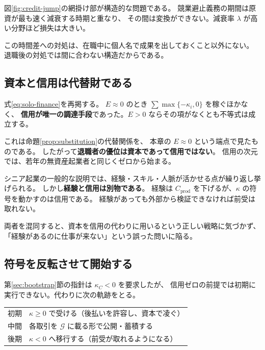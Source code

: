 図\ref{fig:credit-jump}の網掛け部が構造的な問題である。
競業避止義務の期間は原資が最も速く減衰する時期と重なり、
その間は変換ができない。減衰率 $\lambda$ が高い分野ほど損失は大きい。

この時間差への対処は、在職中に個人名で成果を出しておくこと以外にない。
退職後の対処では間に合わない構造だからである。

\subsection{資本と信用は代替財である}

式\eqref{eq:solo-finance}を再掲する。
$E\approx 0$ のとき $\sum\max\{-\kappa_i,0\}$ を稼ぐほかなく、
\textbf{信用が唯一の調達手段}であった。$E>0$ ならその項がなくとも不等式は成立する。

これは命題\ref{prop:substitution}の代替関係を、
本章の $E\approx 0$ という端点で見たものである。
したがって\textbf{退職者の優位は資本であって信用ではない}。
信用の次元では、若年の無資産起業者と同じくゼロから始まる。

\begin{remark}[経験と信用の混同]
シニア起業の一般的な説明では、経験・スキル・人脈が活かせる点が繰り返し挙げられる。
しかし\textbf{経験と信用は別物である}。
経験は $C_{\mathrm{prod}}$ を下げるが、$\kappa$ の符号を動かすのは信用である。
経験があっても外部から検証できなければ前受は取れない。

両者を混同すると、資本を信用の代わりに用いるという正しい戦略に気づかず、
「経験があるのに仕事が来ない」という誤った問いに陥る。
\end{remark}

\subsection{符号を反転させて開始する}

第\ref{sec:bootstrap}節の指針は $\kappa_C<0$ を要求したが、
信用ゼロの前提では初期に実行できない。代わりに次の軌跡をとる。

\begin{center}
\begin{tabularx}{\textwidth}{@{}lX@{}}
\toprule
初期 & $\kappa\geq 0$ で受ける（後払いを許容し、資本で凌ぐ） \\
中間 & 各取引を $\mathcal{G}$ に載る形で公開・蓄積する \\
後期 & $\kappa<0$ へ移行する（前受が取れるようになる） \\
\bottomrule
\end{tabularx}
\label{tab:solo-credit-trajectory}
\end{center}

